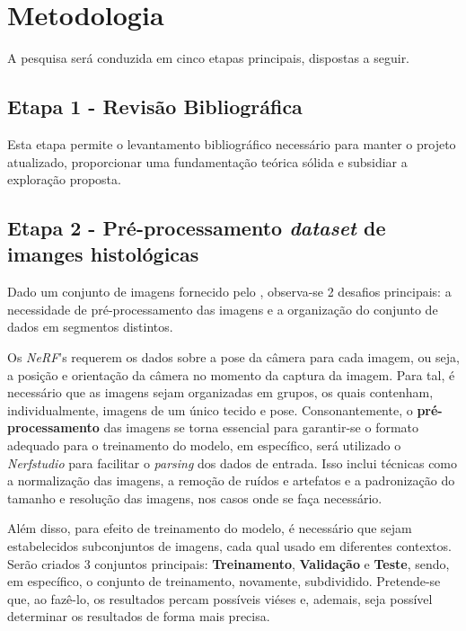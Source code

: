 \section{Metodologia}

A pesquisa será conduzida em cinco etapas principais, dispostas a seguir.


\subsection{Etapa 1 - Revisão Bibliográfica}

Esta etapa permite o levantamento bibliográfico necessário para manter o projeto atualizado, proporcionar uma fundamentação teórica sólida e subsidiar a exploração proposta.


\subsection{Etapa 2 - Pré-processamento \textit{dataset} de imanges histológicas}

  Dado um conjunto de imagens fornecido pelo %
  , observa-se 2 desafios principais: a necessidade de pré-processamento das imagens e a organização do conjunto de dados em segmentos distintos. 
  
  Os \textit{NeRF}'s requerem os dados sobre a pose da câmera para cada imagem, ou seja, a posição e orientação da câmera no momento da captura da imagem. Para tal, é necessário que as imagens sejam organizadas em grupos, os quais contenham, individualmente, imagens de um único tecido e pose. Consonantemente, o \textbf{pré-processamento} das imagens se torna essencial para garantir-se o formato adequado para o treinamento do modelo, em específico, será utilizado o \textit{Nerfstudio} para facilitar o \textit{parsing} dos dados de entrada. Isso inclui técnicas como a normalização das imagens, a remoção de ruídos e artefatos e a padronização do tamanho e resolução das imagens, nos casos onde se faça necessário.

  Além disso, para efeito de treinamento do modelo, é necessário que sejam estabelecidos subconjuntos de imagens, cada qual usado em diferentes contextos. Serão criados 3 conjuntos principais: \textbf{Treinamento}, \textbf{Validação} e  \textbf{Teste}, sendo, em específico, o conjunto de treinamento, novamente, subdividido. Pretende-se que, ao fazê-lo, os resultados percam possíveis viéses e, ademais, seja possível determinar os resultados de forma mais precisa.

